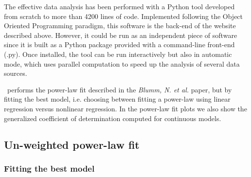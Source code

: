 The effective data analysis has been performed with a Python tool developed from scratch to more than 4200 lines of code. Implemented following the Object Oriented Programming paradigm, this software is the back-end of the website described above. However, it could be run as an independent piece of software since it is built as a Python package provided with a command-line front-end (\CC.py). Once installed, the tool can be run interactively but also in automatic mode, which uses parallel computation to speed up the analysis of several data sources. 

\CC\ performs the power-law fit described in the \emph{Blumm, N. et al.} paper, but by fitting the best model, i.e. choosing between fitting a power-law using linear regression versus nonlinear regression\cite{ecology}. In the power-law fit plots we also show the generalized coefficient of determination computed for continuous models\cite{genR2,disR2}.

\subsection*{Un-weighted power-law fit}\label{sec:unw}

\subsubsection*{Fitting the best model}

